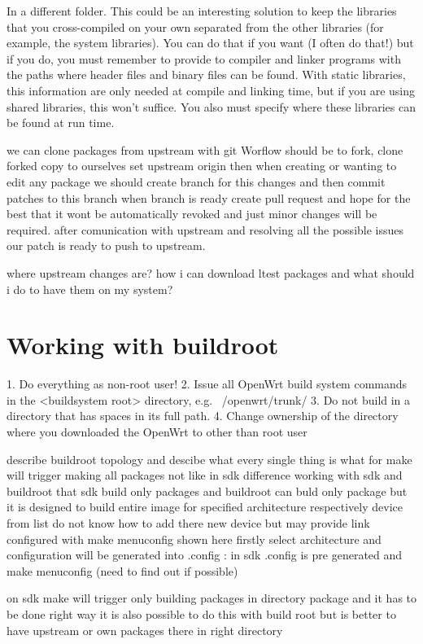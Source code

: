 In a different folder.
This could be an interesting solution to keep the libraries that you cross-compiled on your own separated from the other libraries (for example, the system libraries).
You can do that if you want (I often do that!) but if you do, you must remember to provide to compiler and linker programs with the paths where header files and binary files can be found.
With static libraries, this information are only needed at compile and linking time, but if you are using shared libraries, this won’t suffice.
You also must specify where these libraries can be found at run time.

we can clone packages from upstream with git Worflow should be to fork, clone forked copy to ourselves set upstream origin then when creating or wanting to edit any package we should create branch for this changes and then commit patches to this branch
when branch is ready create pull request and hope for the best that it wont be automatically revoked and just minor changes will be required.
after comunication with upstream and resolving all the possible issues our patch is ready to push to upstream.

where upstream changes are? how i can download ltest packages and what should i do to have them on my system?

\section{Working with buildroot}

1. Do everything as non-root user!
2. Issue all OpenWrt build system commands in the <buildsystem root> directory, e.g. ~/openwrt/trunk/
3. Do not build in a directory that has spaces in its full path.
4. Change ownership of the directory where you downloaded the OpenWrt to other than root user

describe buildroot topology and descibe what every single thing is what for
make will trigger making all packages not like in sdk
difference working with sdk and buildroot that sdk build only packages and buildroot can buld only package but it is designed to build entire image
for specified architecture respectively device from list
do not know how to add there new device but may provide link
configured with make menuconfig shown here firstly select architecture and configuration will be generated into .config :
in sdk .config is pre generated and make menuconfig (need to find out if possible)

on sdk make will trigger only building packages in directory package and it has to be done right way
it is also possible to do this with build root but is better to have upstream or own packages there in right directory

